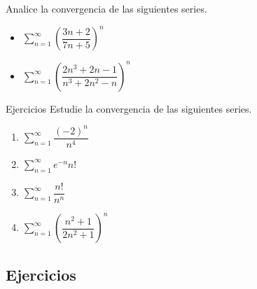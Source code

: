 \begin{frame}
  \begin{egs}
    Analice la convergencia de las siguientes series.\\[0.5cm]
    \begin{itemize}[<+->]
      \item $\displaystyle \sum_{n=1}^{\infty}\left(\dfrac{3n+2}{7n+5}\right)^n$\\
      \vspace{0.25cm}
      \item $\displaystyle \sum_{n=1}^{\infty}\left(\dfrac{2n^3+2n-1}{n^3+2n^2-n}\right)^n$\\
    \end{itemize}
  \end{egs}
\end{frame}

\begin{frame}{Ejercicios}
  Estudie la convergencia de las siguientes series.\\[0.5cm]
  \begin{enumerate}
    \item $\displaystyle\sum_{n=1}^{\infty}\dfrac{(-2)^n}{n^4}$
    \vspace{0.25cm}
    \item $\displaystyle\sum_{n=1}^{\infty}e^{-n}n!$
    \vspace{0.25cm}
    \item $\displaystyle\sum_{n=1}^{\infty}\dfrac{n!}{n^n}$
    \vspace{0.25cm}
    \item $\displaystyle\sum_{n=1}^{\infty}\left(\dfrac{n^2+1}{2n^2+1}\right)^n$
  \end{enumerate}
\end{frame}

\subsection{Ejercicios}
\begin{frame}
\subsectionpage
\end{frame}


